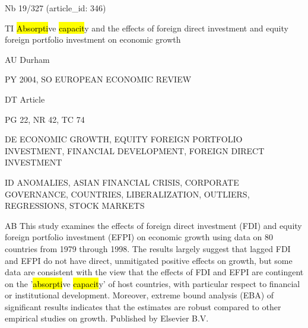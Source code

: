 \documentclass[a4paper]{article}
\begin{document}
\vspace*{-2cm}
Nb \tabto{0cm}19/327 (article\_id: 346)\par
TI \tabto{0cm}\hl{Absorpti}ve \hl{capacit}y and the effects of foreign direct investment and equity foreign portfolio investment on economic growth\par
AU \tabto{0cm}Durham\par
PY \tabto{0cm}2004, SO EUROPEAN ECONOMIC REVIEW\par
DT \tabto{0cm}Article\par
PG \tabto{0cm}22, NR 42, TC 74\par
DE \tabto{0cm}ECONOMIC GROWTH, EQUITY FOREIGN PORTFOLIO INVESTMENT, FINANCIAL DEVELOPMENT, FOREIGN DIRECT INVESTMENT\par
ID \tabto{0cm}ANOMALIES, ASIAN FINANCIAL CRISIS, CORPORATE GOVERNANCE, COUNTRIES, LIBERALIZATION, OUTLIERS, REGRESSIONS, STOCK MARKETS\par
AB \tabto{0cm}This study examines the effects of foreign direct investment (FDI) and equity foreign portfolio investment (EFPI) on economic growth using data on 80 countries from 1979 through 1998. The results largely suggest that lagged FDI and EFPI do not have direct, unmitigated positive effects on growth, but some data are consistent with the view that the effects of FDI and EFPI are contingent on the '\hl{absorpti}ve \hl{capacit}y' of host countries, with particular respect to financial or institutional development. Moreover, extreme bound analysis (EBA) of significant results indicates that the estimates are robust compared to other empirical studies on growth. Published by Elsevier B.V.\par
\clearpage
\end{document}
